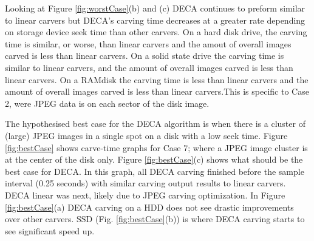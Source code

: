 \documentclass[final,5p,times,twocolumn,authoryear]{elsarticle}
\begin{document}
Looking at Figure \ref{fig:worstCase}(b) and (c) DECA continues to preform similar to linear carvers but DECA's carving time decreases at a greater rate depending on storage device seek time than other carvers. On a hard disk drive, the carving time is similar, or worse, than linear carvers and the amout of overall images carved is less than linear carvers. On a solid state drive the carving time is similar to linear carvers, and the amount of overall images carved is less than linear carvers. On a RAMdisk the carving time is less than linear carvers and the amount of overall images carved is less than linear carvers.This is specific to Case 2, were JPEG data is on each sector of the disk image.

The hypothesised best case for the DECA algorithm is when there is a cluster of (large) JPEG images in a single spot on a disk with a low seek time. Figure \ref{fig:bestCase} shows carve-time graphs for Case 7; where a JPEG image cluster is at the center of the disk only. Figure \ref{fig:bestCase}(c) shows what should be the best case for DECA. In this graph, all DECA carving finished before the sample interval (0.25 seconds) with similar carving output results to linear carvers. DECA linear was next, likely due to JPEG carving optimization. In Figure \ref{fig:bestCase}(a) DECA carving on a HDD does not see drastic improvements over other carvers. SSD (Fig. \ref{fig:bestCase}(b)) is where DECA carving starts to see significant speed up.
\end{document}
